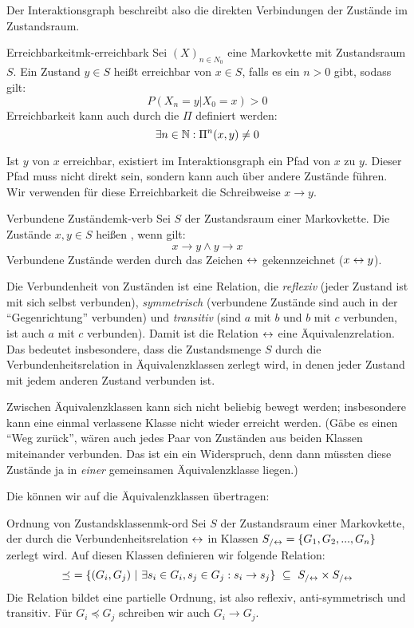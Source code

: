 Der Interaktionsgraph beschreibt also die direkten
Verbindungen der Zustände im Zustandsraum.

\begin{definition}{Erreichbarkeit}{mk-erreichbark}
Sei $(X)_{n\in N_0}$ eine Markovkette mit Zustandsraum $S$. Ein Zustand $y\in S$
heißt erreichbar von $x\in S$, falls es ein $n>0$ gibt, sodass gilt:
\[
P(X_n=y|X_0=x) > 0
\]
Erreichbarkeit kann auch durch die  $\Pi$
definiert werden:
\[
\exists n\in\mathbb{N}: \Pi^n(x,y) \ne 0
\]
\end{definition}

Ist $y$ von $x$ erreichbar, existiert im Interaktionsgraph ein Pfad von $x$ zu
$y$. Dieser Pfad muss nicht direkt sein, sondern kann auch über andere Zustände
führen. Wir verwenden für diese Erreichbarkeit die Schreibweise $x\to y$.

\begin{definition}{Verbundene Zustände}{mk-verb}
Sei $S$ der Zustandsraum einer Markovkette. Die Zustände $x,y\in S$ heißen
, wenn gilt:
\[
x\to y \land y \to x
\]
Verbundene Zustände werden durch das Zeichen $\leftrightarrow$ gekennzeichnet
($x \leftrightarrow y$).
\end{definition}

Die Verbundenheit von Zuständen ist eine Relation, die \emph{reflexiv} (jeder
Zustand ist mit sich selbst verbunden), \emph{symmetrisch} (verbundene
Zustände sind auch in der "`Gegenrichtung"' verbunden) und \emph{transitiv}
(sind $a$ mit $b$ und $b$ mit $c$ verbunden, ist auch $a$ mit $c$
verbunden). Damit ist die Relation $\leftrightarrow$ eine Äquivalenzrelation.
Das bedeutet insbesondere, dass die Zustandsmenge $S$ durch die Verbundenheitsrelation in
Äquivalenzklassen zerlegt wird, in denen jeder Zustand mit jedem anderen Zustand
verbunden ist.

Zwischen Äquivalenzklassen kann sich nicht beliebig bewegt werden; insbesondere
kann eine einmal verlassene Klasse nicht wieder erreicht werden. (Gäbe es einen
"`Weg zurück"', wären auch jedes Paar von Zuständen aus beiden Klassen
miteinander verbunden. Das ist ein ein Widerspruch, denn dann müssten diese
Zustände ja in \emph{einer} gemeinsamen Äquivalenzklasse liegen.)

Die  können wir auf die
Äquivalenzklassen übertragen:
\begin{definition}{Ordnung von Zustandsklassen}{mk-ord}
Sei $S$ der Zustandsraum einer Markovkette, der durch die Verbundenheitsrelation
$\leftrightarrow$ in Klassen $S_{/\leftrightarrow}=\{G_1, G_2,...,G_n\}$ zerlegt wird. Auf diesen
Klassen definieren wir folgende Relation:
\[
\preceq\ =\{(G_i, G_j)\ |\ \exists s_i\in G_i, s_j\in G_j: s_i\to s_j\}\ \subseteq\ S_{/\leftrightarrow}\times S_{/\leftrightarrow}
\]
Die Relation bildet eine partielle Ordnung, ist also reflexiv, anti-symmetrisch und transitiv. Für
$G_i\preceq G_j$ schreiben wir auch $G_i\to G_j$.
\end{definition}

